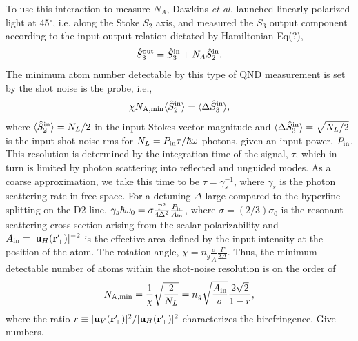 \documentclass[preprint,aps,pra,onecolumn]{revtex4-1} %
\begin{document}
To use this interaction to measure $N_A$, Dawkins {\em et al.} launched linearly polarized light at 45$^\circ$, i.e. along the Stoke $S_2$ axis, and measured the $S_3$ output component according to the input-output relation dictated by Hamiltonian Eq(?),
\begin{equation}
\hat{S}_3^{\rm out} = \hat{S}_3^{\rm in} + N_A \hat{S}_2^{\rm in}.
\end{equation}
The minimum atom number detectable by this type of QND measurement is set by the shot noise is the probe, i.e.,
\begin{equation}
\chi N_{\rm A, min} \langle \hat{S}_2^{\rm in}\rangle =  \langle \Delta \hat{S}_3^{\rm in}\rangle,
\end{equation}
where $\langle \hat{S}_2^{\rm in}\rangle  =N_L/2$ in the input Stokes vector magnitude and  $\langle  \Delta\hat{S}_3^{\rm in}\rangle = \sqrt{N_L/2}$ is the input shot noise rms for $N_L = P_{\rm in}\tau/\hbar\omega$ photons, given an input power, $ P_{\rm in}$.  This resolution is determined by the integration time of the signal, $\tau$, which in turn is limited by photon scattering into reflected and unguided modes. As a coarse approximation, we take this time to be $\tau=\gamma_s^{-1}$, where $\gamma_s$ is the photon scattering rate in free space.  For a detuning $\Delta$ large compared to the hyperfine splitting on the D2 line, $\gamma_s \hbar \omega_0=  \sigma \frac{\Gamma^2}{4 \Delta^2}\frac{P_{\rm in}}{A_{\rm in}}$, where $\sigma = (2/3) \sigma_0$ is the resonant scattering cross section arising from the scalar polarizability and $A_{\rm in}=|\mathbf{u}_{H}(\mathbf{r}'_\perp)|^{-2}$ is the effective area defined by the input intensity at the position of the atom.  The rotation angle, $\chi =n_g  \frac{\sigma}{\tilde{A}}\frac{\Gamma}{2\Delta}$.  Thus, the minimum detectable number of atoms within the shot-noise resolution is on the order of
\begin{equation}
N_{\rm A, min} = \frac{1}{\chi}\sqrt{\frac{2}{N_L}} = n_g \sqrt {\frac{A_{\rm in}}{\sigma}} \frac{  2 \sqrt{2}}{1-r},
\end{equation}
where the ratio $r \equiv |\mathbf{u}_{V}(\mathbf{r}'_\perp)| ^2/|\mathbf{u}_{H}(\mathbf{r}'_\perp)|^2$ characterizes the birefringence. {\color{red}  Give numbers}.
\end{document}
